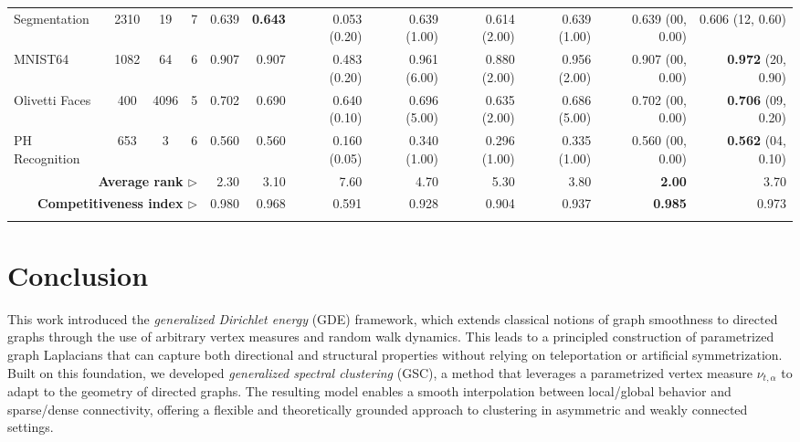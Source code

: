 \documentclass[10pt]{article} %
\newcommand{\bestcell}[1]{\cellcolor{gray!30}\textbf{#1}}
\newcommand{\GSC}{GSC\xspace}
\newcommand{\hyperp}[1]{\tiny{\tiny(#1)}}
\begin{document}
\begin{table}[t]
\begin{adjustbox}{width=\linewidth,center}
\begin{tabular}{lccc|rrrrrr|rr}
Segmentation & 2310 & 19 & 7 & 0.639 & \bestcell{0.643} & 0.053 \hyperp{0.20} & 0.639 \hyperp{1.00} & 0.614 \hyperp{2.00} & 0.639 \hyperp{1.00} & 0.639 \hyperp{00, 0.00} & 0.606 \hyperp{12, 0.60} \\
MNIST64 & 1082 & 64 & 6 & 0.907 & 0.907 & 0.483 \hyperp{0.20} & 0.961 \hyperp{6.00} & 0.880 \hyperp{2.00} & 0.956 \hyperp{2.00} & 0.907 \hyperp{00, 0.00} & \bestcell{0.972} \hyperp{20, 0.90} \\
Olivetti Faces & 400 & 4096 & 5 & 0.702 & 0.690 & 0.640 \hyperp{0.10} & 0.696 \hyperp{5.00} & 0.635 \hyperp{2.00} & 0.686 \hyperp{5.00} & 0.702 \hyperp{00, 0.00} & \bestcell{0.706} \hyperp{09, 0.20} \\
PH Recognition & 653 & 3 & 6 & 0.560 & 0.560 & 0.160 \hyperp{0.05} & 0.340 \hyperp{1.00} & 0.296 \hyperp{1.00} & 0.335 \hyperp{1.00} & 0.560 \hyperp{00, 0.00} & \bestcell{0.562} \hyperp{04, 0.10} \\
\hline
\hline
\multicolumn{4}{r|}{\textbf{Average rank $\rhd$}} & 2.30 & 3.10 & 7.60 & 4.70 & 5.30 & 3.80 & \bestcell{2.00} & 3.70 \\
\multicolumn{4}{r|}{\textbf{Competitiveness index $\rhd$}} & 0.980 & 0.968 & 0.591 & 0.928 & 0.904 & 0.937 & \bestcell{0.985} & 0.973 \\
\Xhline{1pt}
\end{tabular}
\end{adjustbox}
%
\end{table}

\section{Conclusion}
\label{sec:conclusion}

This work introduced the \emph{generalized Dirichlet energy} (GDE) framework, which extends classical notions of graph smoothness to directed graphs through the use of arbitrary vertex measures and random walk dynamics. This leads to a principled construction of parametrized graph Laplacians that can capture both directional and structural properties without relying on teleportation or artificial symmetrization.
%
Built on this foundation, we developed \emph{generalized spectral clustering} (\GSC), a method that leverages a parametrized vertex measure $\nu_{t,\alpha}$ to adapt to the geometry of directed graphs. The resulting model enables a smooth interpolation between local/global behavior and sparse/dense connectivity, offering a flexible and theoretically grounded approach to clustering in asymmetric and weakly connected settings.
\end{document}
